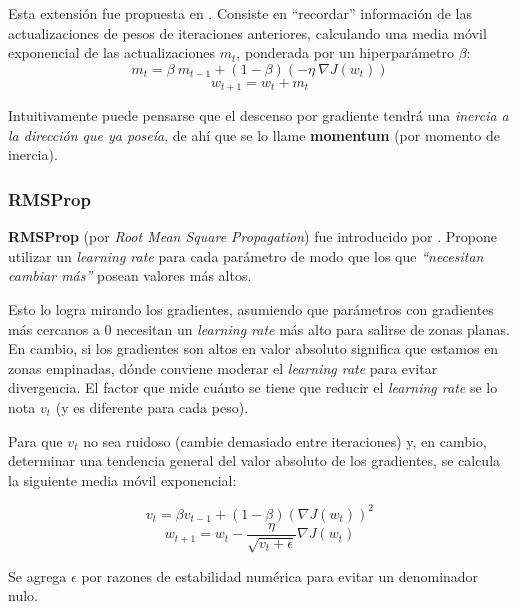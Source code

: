 Esta extensión fue propuesta en \cite{momentum}. Consiste en ``recordar'' información de las actualizaciones de pesos de iteraciones anteriores, calculando una media móvil exponencial de las actualizaciones $m_t$, ponderada por un hiperparámetro $\beta$:
\begin{equation*}
    m_t = \beta~m_{t-1} + (1-\beta) (- \eta~\nabla J(w_t))
\end{equation*}
\begin{equation*}
    w_{t+1} = w_t + m_t
\end{equation*}

Intuitivamente puede pensarse que el descenso por gradiente tendrá una \textit{inercia a la dirección que ya poseía}, de ahí que se lo llame \textbf{momentum} (por momento de inercia).

\subsubsection{RMSProp}

\textbf{RMSProp} (por \textit{Root Mean Square Propagation}) fue introducido por \cite{rmsprop}. Propone utilizar un \textit{learning rate} para cada parámetro de modo que los que \textit{``necesitan cambiar más''} posean valores más altos.

Esto lo logra mirando los gradientes, asumiendo que parámetros con gradientes más cercanos a 0 necesitan un \textit{learning rate} más alto para salirse de zonas planas. En cambio, si los gradientes son altos en valor absoluto significa que estamos en zonas empinadas, dónde conviene moderar el \textit{learning rate} para evitar divergencia. El factor que mide cuánto se tiene que reducir el \textit{learning rate} se lo nota $v_t$ (y es diferente para cada peso).

Para que $v_t$ no sea ruidoso (cambie demasiado entre iteraciones) y, en cambio, determinar una tendencia general del valor absoluto de los gradientes, se calcula la siguiente media móvil exponencial:


\begin{equation*}
    v_t = \beta v_{t-1} + (1-\beta) (\nabla J(w_t))^2
\end{equation*}
\begin{equation*}
    w_{t+1} = w_t - \frac{\eta}{\sqrt{v_t + \epsilon}} \nabla J (w_t)
\end{equation*}

Se agrega $\epsilon$ por razones de estabilidad numérica para evitar un denominador nulo.

